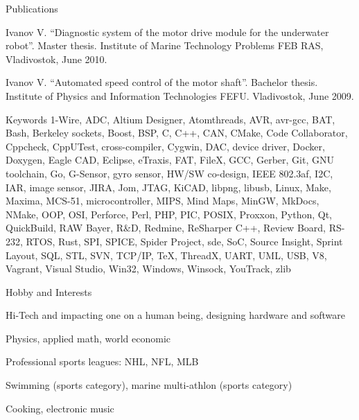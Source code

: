 \documentclass{template}
\begin{document}

\begin{rSection}{Publications}
\begin{rItemize}
\item Ivanov V. \textquotedblleft Diagnostic system of the motor drive module for the underwater robot\textquotedblright. Master thesis. Institute of Marine Technology Problems FEB RAS, Vladivostok, June 2010.
\item Ivanov V. \textquotedblleft Automated speed control of the motor shaft\textquotedblright. Bachelor thesis. \newline Institute of Physics and Information Technologies FEFU. Vladivostok, June 2009.
\end{rItemize}
\end{rSection}


\begin{rSection}{Keywords}
1-Wire, ADC, Altium Designer, Atomthreads, AVR, avr-gcc, BAT, Bash, Berkeley sockets, Boost, BSP, C, C++, CAN, CMake, Code Collaborator, Cppcheck, CppUTest, cross-compiler, Cygwin, DAC, device driver, Docker, Doxygen, Eagle CAD, Eclipse, eTraxis, FAT, FileX, GCC, Gerber, Git, GNU toolchain, Go, G-Sensor, gyro sensor, HW/SW co-design, IEEE 802.3af, I2C, IAR, image sensor, JIRA, Jom, JTAG, KiCAD, libpng, libusb, Linux, Make, Maxima, MCS-51, microcontroller, MIPS, Mind Maps, MinGW, MkDocs, NMake, OOP, OSI, Perforce, Perl, PHP, PIC, POSIX, Proxxon, Python, Qt, QuickBuild, RAW Bayer, R\&D, Redmine, ReSharper C++, Review Board, RS-232, RTOS, Rust, SPI, SPICE, Spider Project, sde, SoC, Source Insight, Sprint Layout, SQL, STL, SVN, TCP/IP, \TeX, ThreadX, UART, UML, USB, V8, Vagrant, Visual Studio, Win32, Windows, Winsock, YouTrack, zlib
\end{rSection}


\begin{rSection}{Hobby and Interests}
\begin{rHobby}
\item Hi-Tech and impacting one on a human being, designing hardware and software
\item Physics, applied math, world economic
\item Professional sports leagues: NHL, NFL, MLB
\item Swimming (sports category), marine multi-athlon (sports category)
\item Cooking, electronic music
\end{rHobby}
\end{rSection}
\end{document}
